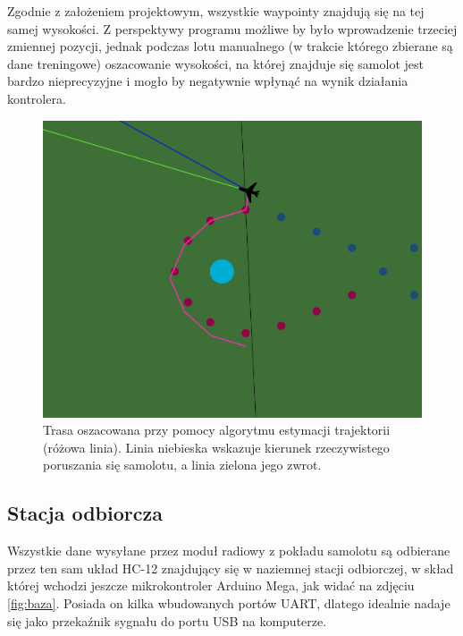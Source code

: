 \documentclass[12pt, a4paper]{article}
\begin{document}
Zgodnie z założeniem projektowym, wszystkie waypointy znajdują się na tej samej wysokości. Z perspektywy programu możliwe by było wprowadzenie trzeciej zmiennej pozycji, jednak podczas lotu manualnego (w trakcie którego zbierane są dane treningowe) oszacowanie wysokości, na której znajduje się samolot jest bardzo nieprecyzyjne i mogło by negatywnie wpłynąć na wynik działania kontrolera.

\begin{figure}[ht]
    \centering
    \includegraphics[width=1\textwidth]{estymacja}
    \caption{Trasa oszacowana przy pomocy algorytmu estymacji trajektorii (różowa linia). Linia niebieska wskazuje kierunek rzeczywistego poruszania się samolotu, a linia zielona jego zwrot.}
    \label{fig:estymacja}
\end{figure}

 \FloatBarrier
\subsection{Stacja odbiorcza}
Wszystkie dane wysyłane przez moduł radiowy z pokładu samolotu są odbierane przez ten sam układ HC-12 znajdujący się w naziemnej stacji odbiorczej, w skład której wchodzi jeszcze mikrokontroler Arduino Mega, jak widać na zdjęciu \ref{fig:baza}. Posiada on kilka wbudowanych portów UART, dlatego idealnie nadaje się jako przekaźnik sygnału do portu USB na komputerze.
\end{document}
